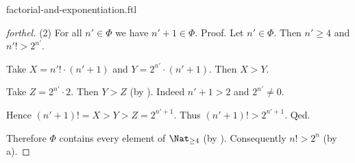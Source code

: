 \documentclass{naproche-library}
\begin{document}
\begin{smodule}{factorial-and-exponentiation.ftl}
\begin{proof}[forthel]
    (2) For all $n' \in \Phi$ we have $n' + 1 \in \Phi$. \newline
    Proof.
      Let $n' \in \Phi$.
      Then $n' \geq 4$ and $n'! > 2^{n'}$.

      Take $X = n'! \cdot (n' + 1)$ and $Y = 2^{n'} \cdot (n' + 1)$.
      Then $X > Y$.

      Take $Z = 2^{n'} \cdot 2$.
      Then $Y > Z$ (by ).
      Indeed $n' + 1 > 2$ and $2^{n'} \neq 0$.

      Hence $(n' + 1)! = X > Y > Z = 2^{n' + 1}$.
      Thus $(n' + 1)! > 2^{n' + 1}$.
    Qed.

    Therefore $\Phi$ contains every element of $\Nat_{\geq 4}$ (by ).
    Consequently $n! > 2^{n}$ (by a).
  \end{proof}
\end{smodule}
\end{document}
